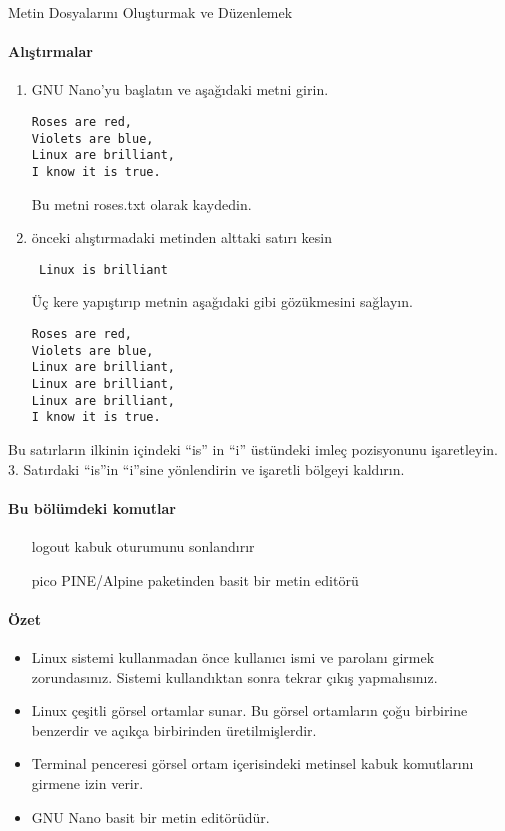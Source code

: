 \begin{section}{Metin Dosyalarını Oluşturmak ve Düzenlemek}
\paragraph{{\Huge{\PencilLeftDown}}Alıştırmalar}{
\begin{enumerate}
 \item GNU Nano’yu başlatın ve aşağıdaki metni girin.
 \footnotesize
 \begin{verbatim}
Roses are red,
Violets are blue,
Linux are brilliant,
I know it is true.
 \end{verbatim}
\normalsize 
 Bu metni roses.txt olarak kaydedin.
 \item önceki alıştırmadaki metinden alttaki satırı kesin
 \footnotesize
 \begin{verbatim}
 Linux is brilliant
 \end{verbatim}
 \normalsize 
 Üç kere yapıştırıp metnin aşağıdaki gibi gözükmesini sağlayın.
\footnotesize
 \begin{verbatim}
Roses are red,
Violets are blue,
Linux are brilliant,
Linux are brilliant,
Linux are brilliant,
I know it is true.
 \end{verbatim}
 \normalsize 
\end{enumerate}}

Bu satırların ilkinin içindeki “is” in “i” üstündeki imleç pozisyonunu işaretleyin. 3. Satırdaki “is”in “i”sine yönlendirin ve işaretli bölgeyi kaldırın.
\end{section}
\paragraph{Bu bölümdeki komutlar}{
\begin{itemize}
\item[logout]kabuk oturumunu sonlandırır
\item[pico]PINE/Alpine paketinden basit bir metin editörü
\end{itemize}}

\paragraph{Özet}{
\begin{itemize}
\item Linux sistemi kullanmadan önce kullanıcı ismi ve parolanı girmek zorundasınız. Sistemi kullandıktan sonra tekrar çıkış yapmalısınız.
\item Linux çeşitli görsel ortamlar sunar. Bu görsel ortamların çoğu birbirine benzerdir ve açıkça birbirinden üretilmişlerdir.
\item Terminal penceresi görsel ortam içerisindeki metinsel kabuk komutlarını girmene izin verir. 
\item GNU Nano basit bir metin editörüdür.
\end{itemize}
}